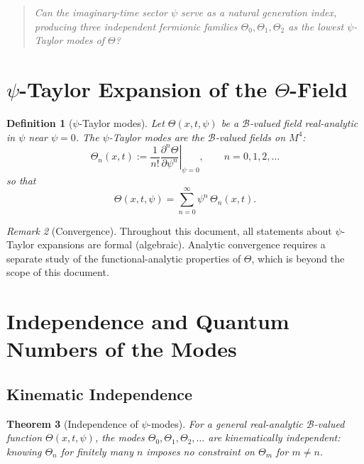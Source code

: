 \documentclass[12pt,a4paper]{article}
\newtheorem{theorem}{Theorem}[section]
\newtheorem{definition}[theorem]{Definition}
\theoremstyle{remark}
\newtheorem{remark}[theorem]{Remark}
\begin{document}
\begin{quote}
\emph{Can the imaginary-time sector $\psi$ serve as a natural generation index,
producing three independent fermionic families $\Theta_0, \Theta_1, \Theta_2$
as the lowest $\psi$-Taylor modes of $\Theta$?}
\end{quote}

\section{$\psi$-Taylor Expansion of the $\Theta$-Field}
\label{sec:expansion}

\begin{definition}[$\psi$-Taylor modes]
  \label{def:psi_modes}
  Let $\Theta(x, t, \psi)$ be a $\mathcal{B}$-valued field real-analytic in
  $\psi$ near $\psi = 0$.  The \emph{$\psi$-Taylor modes} are the
  $\mathcal{B}$-valued fields on $M^4$:
  \[
    \Theta_n(x, t) := \frac{1}{n!}
    \left.\frac{\partial^n \Theta}{\partial \psi^n}\right|_{\psi=0},
    \qquad n = 0, 1, 2, \ldots
  \]
  so that
  \[
    \Theta(x, t, \psi) = \sum_{n=0}^{\infty} \psi^n\, \Theta_n(x, t).
  \]
\end{definition}

\begin{remark}[Convergence]
  Throughout this document, all statements about $\psi$-Taylor expansions
  are formal (algebraic).  Analytic convergence requires a separate study of
  the functional-analytic properties of $\Theta$, which is beyond the scope
  of this document.
\end{remark}

\section{Independence and Quantum Numbers of the Modes}
\label{sec:independence}

\subsection{Kinematic Independence}

\begin{theorem}[Independence of $\psi$-modes]
  \label{thm:mode_independence}
  For a general real-analytic $\mathcal{B}$-valued function $\Theta(x,t,\psi)$,
  the modes $\Theta_0, \Theta_1, \Theta_2, \ldots$ are kinematically
  independent: knowing $\Theta_n$ for finitely many $n$ imposes no constraint
  on $\Theta_m$ for $m \neq n$.
\end{theorem}
\end{document}
